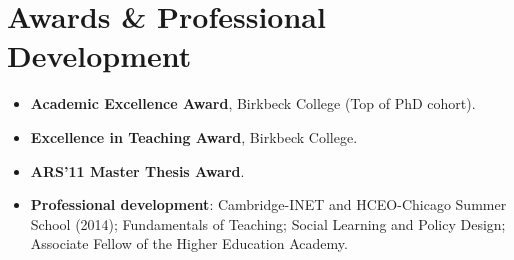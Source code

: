 \documentclass[11pt,a4paper]{article}
\begin{document}
\section{Awards \& Professional Development}
\begin{itemize}[noitemsep, topsep=2pt]
    \item \textbf{Academic Excellence Award}, Birkbeck College (Top of PhD cohort).
    \item \textbf{Excellence in Teaching Award}, Birkbeck College.
    \item \textbf{ARS'11 Master Thesis Award}.
    \item \textbf{Professional development}: Cambridge-INET and HCEO-Chicago Summer School (2014); Fundamentals of Teaching; Social Learning and Policy Design; Associate Fellow of the Higher Education Academy.
\end{itemize}
\end{document}

